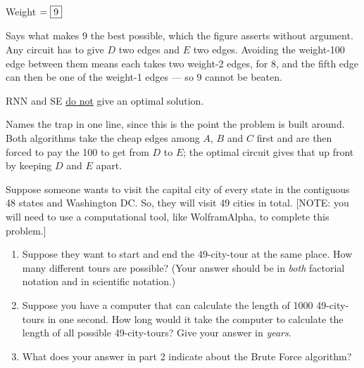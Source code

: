 \begin{sol}
\begin{center}\end{center}

\vspace{0.3em}
Weight $= \fbox{9}$

\begin{add}{Says what makes 9 the best possible, which the figure asserts without argument.}
Any circuit has to give $D$ two edges and $E$ two edges. Avoiding the weight-100 edge between them
means each takes two weight-2 edges, for 8, and the fifth edge can then be one of the weight-1
edges --- so 9 cannot be beaten.
\end{add}
\end{sol}

\begin{sol}
 RNN and SE \underline{do not} give an optimal solution.

\begin{add}{Names the trap in one line, since this is the point the problem is built around.}
Both algorithms take the cheap edges among $A$, $B$ and $C$ first and are then forced to pay the
100 to get from $D$ to $E$; the optimal circuit gives that up front by keeping $D$ and $E$ apart.
\end{add}
\end{sol}


\begin{stmt}
Suppose someone wants to visit the capital city of every state in the contiguous 48 states and
Washington DC. So, they will visit 49 cities in total. [NOTE: you will need to use a computational
tool, like WolframAlpha, to complete this problem.]

\begin{enumerate}[nosep]
\item Suppose they want to start and end the 49-city-tour at the same place. How many different
tours are possible? (Your answer should be in \emph{both} factorial notation and in scientific
notation.)
\item Suppose you have a computer that can calculate the length of 1000 49-city-tours in one
second. How long would it take the computer to calculate the length of all possible
49-city-tours? Give your answer in \emph{years}.
\item What does your answer in part 2 indicate about the Brute Force algorithm?
\end{enumerate}
\end{stmt}

